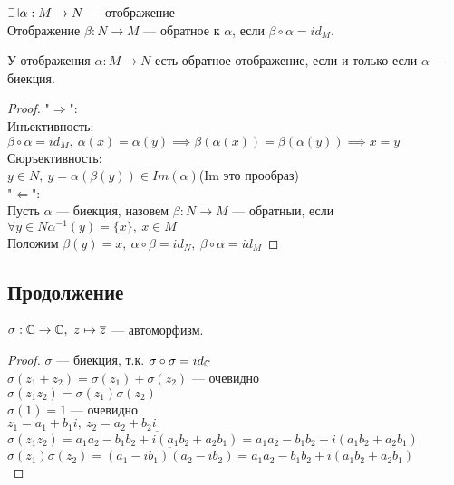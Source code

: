 \begin{normalsize}
\begin{defn}
    $\letus \alpha: M \to N$ --- отображение\\
    Отображение $\beta: N \to M$ --- обратное к $\alpha$, если $\beta \circ \alpha = id_M$.
\end{defn}

\begin{theorem-non}
    У отображения $\alpha: M \to N$ есть обратное отображение, если и только если $\alpha$ --- биекция.
\end{theorem-non}


\begin{proof}
    "$\Rightarrow$":\\
    Инъективность:\\
    $\beta \circ \alpha = id_M,~\alpha(x) = \alpha(y) \implies \beta(\alpha(x)) = \beta(\alpha(y)) \implies x = y$\\
    Сюръективность:\\
    $y \in N,~y = \alpha(\beta(y)) \in Im(\alpha)$(Im это прообраз)\\
    "$\Leftarrow$":\\
    Пусть $\alpha$ --- биекция, назовем $\beta: N \to M$ --- обратныи, если $\forall y \in N \alpha^{-1}(y) = \{x\},~x \in M$\\
    Положим $\beta(y) = x,~\alpha \circ \beta = id_N,~\beta \circ \alpha = id_M$
\end{proof}

\subsection*{Продолжение}

\begin{theorem-non}
    $\sigma: \mathbb{C} \to \mathbb{C},~z \mapsto \overline{z}$ --- автоморфизм.
\end{theorem-non}

\begin{proof}
    $\sigma$ --- биекция, т.к. $\sigma \circ \sigma = id_{\mathbb{C}}$\\
    $\sigma(z_1 + z_2) = \sigma(z_1) + \sigma(z_2)$ --- очевидно\\
    $\sigma(z_1 z_2) = \sigma(z_1) \sigma(z_2)$\\
    $\sigma(1) = 1$ --- очевидно\\
    $z_1 = a_1 + b_1i,~z_2 = a_2 + b_2i$\\
    $\sigma(z_1 z_2) = \overline{a_1 a_2 - b_1 b_2 + i(a_1 b_2 + a_2 b_1)} = a_1 a_2 - b_1 b_2 + i(a_1 b_2 + a_2 b_1)$\\
    $\sigma(z_1) \sigma(z_2) = \overline{(a_1 - i b_1) (a_2 - i b_2)} = a_1 a_2 - b_1 b_2 + i(a_1 b_2 + a_2 b_1)$\\
\end{proof}

\end{normalsize}